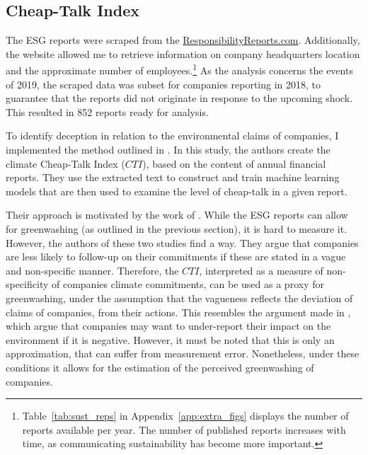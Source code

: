 \documentclass[12pt]{article}
\begin{document}
\subsection{Cheap-Talk Index}

The ESG reports were scraped from the \href{https://responsibilityreports.com}{ResponsibilityReports.com}. Additionally, the website allowed me to retrieve information on company headquarters location and the approximate number of employees.\footnote{Table~\ref{tab:sust_reps} in Appendix~\ref{app:extra_figs} displays the number of reports available per year. The number of published reports increases with time, as communicating sustainability has become more important.} As the analysis concerns the events of 2019, the scraped data was subset for companies reporting in 2018, to guarantee that the reports did not originate in response to the upcoming shock. This resulted in 852 reports ready for analysis. 

To identify deception in relation to the environmental claims of companies, I implemented the method outlined in \textcite{binglerHowCheapTalk2024}. In this study, the authors create the climate Cheap-Talk Index ($CTI$), based on the content of annual financial reports. They use the extracted text to construct and train machine learning models that are then used to examine the level of cheap-talk in a given report. 

Their approach is motivated by the work of \textcite{coenAreCorporateClimate2022, ramusWhenAreCorporate2005}. While the ESG reports can allow for greenwashing (as outlined in the previous section), it is hard to measure it. However, the authors of these two studies find a way. They argue that companies are less likely to follow-up on their commitments if these are stated in a vague and non-specific manner. Therefore, the $CTI$, interpreted as a measure of non-specificity of companies climate commitments, can be used as a proxy for greenwashing, under the assumption that the vagueness reflects the deviation of claims of companies, from their actions. This resembles the argument made in \textcite{binglerCheapTalkCherrypicking2022,marquisScrutinyNormsSelective2016}, which argue that companies may want to under-report their impact on the environment if it is negative. However, it must be noted that this is only an approximation, that can suffer from measurement error. Nonetheless, under these conditions it allows for the estimation of the perceived greenwashing of companies. 
\end{document}
